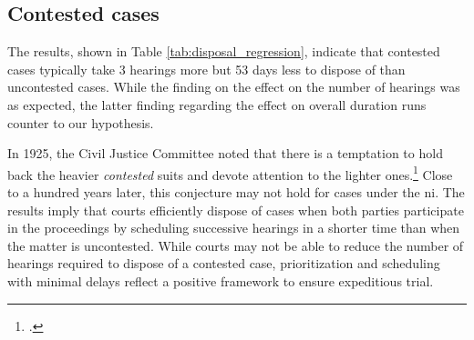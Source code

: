 \documentclass[12pt,a4paper]{article}
\begin{document}
	\subsection{Contested cases}
	\label{sec:contested-cases}
	
	The results, shown in Table \ref{tab:disposal_regression}, indicate that contested cases typically take 3 hearings more but 53 days less to dispose of than uncontested cases. While the finding on the effect on the number of hearings was as expected, the latter finding regarding the effect on overall duration runs counter to our hypothesis.
	
	In 1925, the Civil Justice Committee noted that there is a temptation to hold back the heavier \textit{contested} suits and devote attention to the lighter ones.\footcite{cg1925_civiljustice} Close to a hundred years later, this conjecture may not hold for cases under the \gls{ni}. The results imply that courts efficiently dispose of cases when both parties participate in the proceedings by scheduling successive hearings in a shorter time than when the matter is uncontested.
	While courts may not be able to reduce the number of hearings required to dispose of a contested case, prioritization and scheduling with minimal delays reflect a positive framework to ensure expeditious trial. %
	
	
\end{document}
